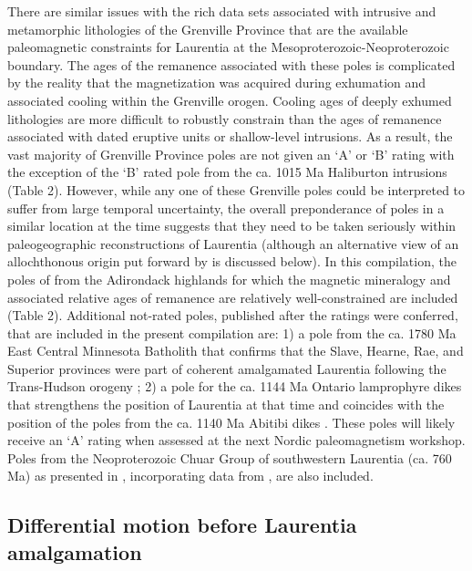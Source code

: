 \documentclass[twocolumn, switch]{article} %
\begin{document}
There are similar issues with the rich data sets associated with intrusive and metamorphic lithologies of the Grenville Province that are the available paleomagnetic constraints for Laurentia at the Mesoproterozoic-Neoproterozoic boundary. The ages of the remanence associated with these poles is complicated by the reality that the magnetization was acquired during exhumation and associated cooling within the Grenville orogen. Cooling ages of deeply exhumed lithologies are more difficult to robustly constrain than the ages of remanence associated with dated eruptive units or shallow-level intrusions. As a result, the vast majority of Grenville Province poles are not given an `A' or `B' rating with the exception of the `B' rated pole from the ca. 1015 Ma Haliburton intrusions (Table 2). However, while any one of these Grenville poles could be interpreted to suffer from large temporal uncertainty, the overall preponderance of poles in a similar location at the time suggests that they need to be taken seriously within paleogeographic reconstructions of Laurentia (although an alternative view of an allochthonous origin put forward by \citealp{Halls2015a} is discussed below). In this compilation, the poles of \cite{Brown2012a} from the Adirondack highlands for which the magnetic mineralogy and associated relative ages of remanence are relatively well-constrained are included (Table 2). Additional not-rated poles, published after the ratings were conferred, that are included in the present compilation are: 1) a pole from the ca. 1780 Ma East Central Minnesota Batholith that confirms that the Slave, Hearne, Rae, and Superior provinces were part of coherent amalgamated Laurentia following the Trans-Hudson orogeny \citep{Swanson-Hysell2021a}; 2) a pole for the ca. 1144 Ma Ontario lamprophyre dikes \citep{Piispa2018a} that strengthens the position of Laurentia at that time and coincides with the position of the poles from the ca. 1140 Ma Abitibi dikes \citep{Ernst1993a}. These poles will likely receive an `A' rating when assessed at the next Nordic paleomagnetism workshop. Poles from the Neoproterozoic Chuar Group of southwestern Laurentia (ca. 760 Ma)  as presented in \cite{Eyster2020a}, incorporating data from \cite{Weil2004a}, are also included. 

\subsection{Differential motion before Laurentia amalgamation}
\end{document}

